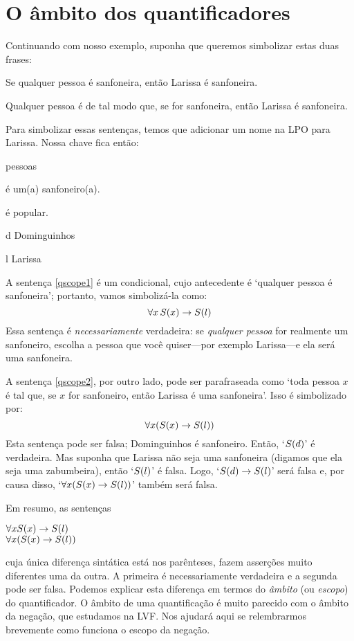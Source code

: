 \section{O âmbito dos quantificadores}\label{SecaoAmbito}
Continuando com nosso exemplo, suponha que queremos simbolizar estas duas frases:
	\begin{earg}
		\item[\ex{qscope1}] Se qualquer pessoa é sanfoneira, então Larissa é sanfoneira.
		\item[\ex{qscope2}] Qualquer pessoa é de tal modo que, se for sanfoneira, então Larissa é  sanfoneira.
	\end{earg}
Para simbolizar essas sentenças, temos que adicionar um nome na LPO para Larissa.
Nossa chave fica então:
	\begin{center}
	\begin{ekey}
		\item[\text{domínio}] pessoas
		\item[\atom{S}{x}]  é um(a) sanfoneiro(a).
		\item[\atom{P}{x}]  é popular.
		\item[d] Dominguinhos
		\item[l] Larissa
	\end{ekey}
	\end{center}
A sentença \ref{qscope1} é um condicional, cujo antecedente é `qualquer pessoa é sanfoneira'; portanto, vamos simbolizá-la como:
$$\forall x\, \mathord{S}(x) \rightarrow \mathord{S}(l)$$
Essa sentença é \emph{necessariamente} verdadeira:
se \emph{qualquer pessoa} for realmente um sanfoneiro, escolha a pessoa que você quiser---por exemplo Larissa---e ela será uma sanfoneira.

A sentença \ref{qscope2}, por outro lado, pode ser parafraseada como `toda pessoa $x$ é tal que, se $x$ for sanfoneiro, então Larissa é uma sanfoneira'. Isso é simbolizado por:
$$\forall x (\mathord{S}(x) \rightarrow \mathord{S}(l))$$
Esta sentença pode ser falsa; Dominguinhos é sanfoneiro.
Então, `$\mathord{S}(d)$' é verdadeira. 
Mas suponha que Larissa não seja uma sanfoneira (digamos que ela seja  uma zabumbeira), então `$\mathord{S}(l)$' é falsa.
Logo, `$\mathord{S}(d) \rightarrow \mathord{S}(l)$' será falsa e, por causa disso, \mbox{`$\forall x (\mathord{S}(x) \rightarrow \mathord{S}(l))$'} também será falsa.

Em resumo, as sentenças
\begin{center}
	$\forall x \mathord{S}(x) \rightarrow \mathord{S}(l)$ \\ $\forall x (\mathord{S}(x) \rightarrow \mathord{S}(l))$
\end{center} 
cuja única diferença sintática está nos parênteses, fazem asserções muito diferentes uma da outra.
A primeira é necessariamente verdadeira e a segunda pode ser falsa.
Podemos explicar esta diferença em termos do \emph{âmbito} (ou \emph{escopo}) do quantificador.
O âmbito de uma quantificação é muito parecido com o âmbito da negação, que estudamos na LVF.
Nos ajudará aqui se relembrarmos brevemente como funciona o escopo da negação.

